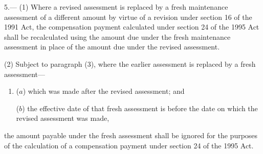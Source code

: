 \documentclass[12pt,a4paper]{article}
\begin{document}
5.—%
%
%
%
%
%
%
(1) Where a revised assessment is replaced by a fresh maintenance assessment of a different amount by virtue of a revision under section 16 of the 1991 Act, the compensation payment calculated under section 24 of the 1995 Act shall be recalculated using the amount due under the fresh maintenance assessment in place of the amount due under the revised assessment.

(2) Subject to paragraph (3), where the earlier assessment is replaced by a fresh assessment—
\begin{enumerate}\item[]
($a$) which was made after the revised assessment; and

($b$) the effective date of that fresh assessment is before the date on which the revised assessment was made,
\end{enumerate}
the amount payable under the fresh assessment shall be ignored for the purposes of the calculation of a compensation payment under section 24 of the 1995 Act.
\end{document}
